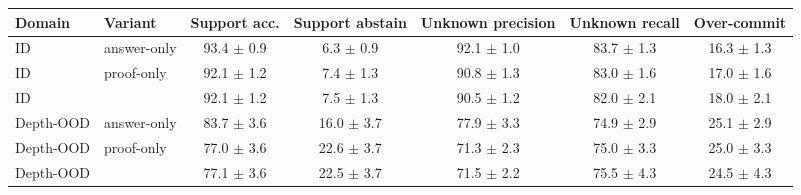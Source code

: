 \begin{tabular}{llccccc}
\toprule
Domain & Variant & Support acc. & Support abstain & Unknown precision & Unknown recall & Over-commit \\
\midrule
ID & answer-only & 93.4 $\pm$ 0.9 & 6.3 $\pm$ 0.9 & 92.1 $\pm$ 1.0 & 83.7 $\pm$ 1.3 & 16.3 $\pm$ 1.3 \\
ID & proof-only & 92.1 $\pm$ 1.2 & 7.4 $\pm$ 1.3 & 90.8 $\pm$ 1.3 & 83.0 $\pm$ 1.6 & 17.0 $\pm$ 1.6 \\
ID & \model{} & 92.1 $\pm$ 1.2 & 7.5 $\pm$ 1.3 & 90.5 $\pm$ 1.2 & 82.0 $\pm$ 2.1 & 18.0 $\pm$ 2.1 \\
\midrule
Depth-OOD & answer-only & 83.7 $\pm$ 3.6 & 16.0 $\pm$ 3.7 & 77.9 $\pm$ 3.3 & 74.9 $\pm$ 2.9 & 25.1 $\pm$ 2.9 \\
Depth-OOD & proof-only & 77.0 $\pm$ 3.6 & 22.6 $\pm$ 3.7 & 71.3 $\pm$ 2.3 & 75.0 $\pm$ 3.3 & 25.0 $\pm$ 3.3 \\
Depth-OOD & \model{} & 77.1 $\pm$ 3.6 & 22.5 $\pm$ 3.7 & 71.5 $\pm$ 2.2 & 75.5 $\pm$ 4.3 & 24.5 $\pm$ 4.3 \\
\bottomrule
\end{tabular}